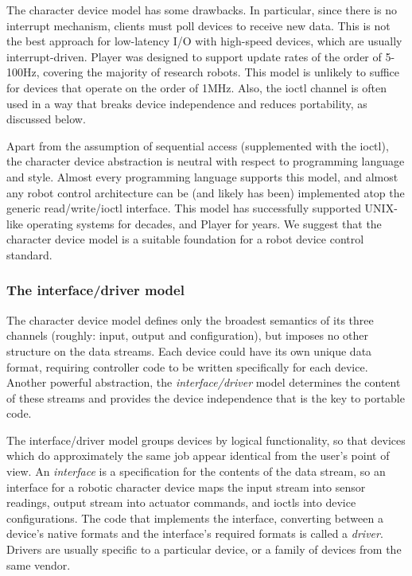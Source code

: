The character device model has some drawbacks. In particular, since there
is no interrupt mechanism, clients must poll devices to receive new data.
This is not the best approach for low-latency I/O with high-speed devices,
which are usually interrupt-driven.  Player was designed to support update
rates of the order of 5-100Hz, covering the majority of research robots.
This model is unlikely to suffice for devices that operate on the order of
1MHz. Also, the ioctl channel is often used in a way that breaks device
independence and reduces portability, as discussed below.

Apart from the assumption of sequential access (supplemented with the
ioctl), the character device abstraction is neutral with respect to
programming language and style. Almost every programming language supports
this model, and almost any robot control architecture can be (and likely
has been) implemented atop the generic read/write/ioctl interface.  This
model has successfully supported UNIX-like operating systems for decades,
and Player for years.  We suggest that the character device model is a
suitable foundation for a robot device control standard.

\subsubsection{The interface/driver model}
The character device model defines only the broadest semantics of its
three channels (roughly: input, output and configuration), but imposes
no other structure on the data streams. Each device could have its own
unique data format, requiring controller code to be written
specifically for each device. Another powerful abstraction, the {\em
interface/driver} model determines the content of these streams and
provides the device independence that is the key to portable code.

The interface/driver model groups devices by logical functionality, so
that devices which do approximately the same job appear identical from
the user's point of view. An {\em interface} is a specification for
the contents of the data stream, so an interface for a robotic
character device maps the input stream into sensor readings, output
stream into actuator commands, and ioctls into device
configurations. The code that implements the interface, converting
between a device's native formats and the interface's required formats
is called a {\em driver}. Drivers are usually specific to a particular
device, or a family of devices from the same vendor.

